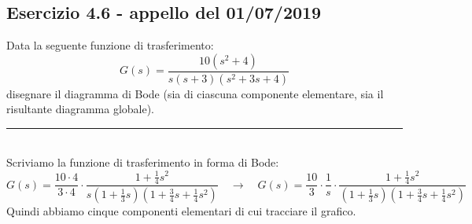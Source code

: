 \documentclass[12pt,a4paper]{article}
\begin{document}
	\subsection*{Esercizio 4.6 - appello del 01/07/2019} Data la seguente funzione di trasferimento:
	\[
		G(s) = \frac{10(s^2+4)}{s(s+3)(s^2+3s+4)}
	\]
	disegnare il diagramma di Bode (sia di ciascuna componente elementare, sia il risultante diagramma globale).
	\par\noindent\rule{\textwidth}{0.4pt}
	\vspace{5mm}
	\\
	Scriviamo la funzione di trasferimento in forma di Bode:
	\[
		G(s) = \frac{10 \cdot 4}{3 \cdot 4}\cdot\frac{1+\frac{1}{4}s^2}{s\left(1+\frac{1}{3}s\right)\left(1+\frac{3}{4}s+\frac{1}{4}s^2\right)}\quad\rightarrow\quad G(s) = \frac{10}{3}\cdot\frac{1}{s}\cdot\frac{1+\frac{1}{4}s^2}{\left(1+\frac{1}{3}s\right)\left(1+\frac{3}{4}s+\frac{1}{4}s^2\right)}
	\]
	Quindi abbiamo cinque componenti elementari di cui tracciare il grafico.\\
\end{document}
